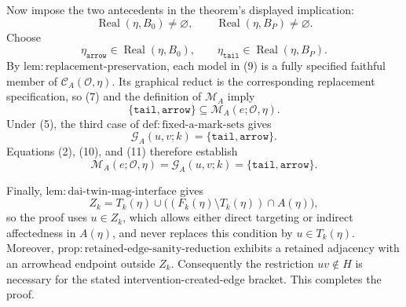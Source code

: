 Now impose the two antecedents in the theorem's displayed implication:
\[
 \operatorname{Real}(\eta,B_0)\ne\varnothing,
 \qquad
 \operatorname{Real}(\eta,B_P)\ne\varnothing.
 \tag{8}
\]
Choose
\[
 \eta_{\mathtt{arrow}}\in\operatorname{Real}(\eta,B_0),
 \qquad
 \eta_{\mathtt{tail}}\in\operatorname{Real}(\eta,B_P).
 \tag{9}
\]
By \(\mathrm{lem:replacement\mbox{-}preservation}\), each model in (9) is a fully specified faithful member of \(\mathcal C_A(\mathcal O,\eta)\).  Its graphical reduct is the corresponding replacement specification, so (7) and the definition of \(\mathcal M_A\) imply
\[
 \{\mathtt{tail},\mathtt{arrow}\}
 \subseteq\mathcal M_A(e;\mathcal O,\eta).
 \tag{10}
\]
Under (5), the third case of \(\mathrm{def:fixed\mbox{-}a\mbox{-}mark\mbox{-}sets}\) gives
\[
 \mathcal G_A(u,v;k)=\{\mathtt{tail},\mathtt{arrow}\}.
 \tag{11}
\]
Equations (2), (10), and (11) therefore establish
\[
 \mathcal M_A(e;\mathcal O,\eta)
 =\mathcal G_A(u,v;k)
 =\{\mathtt{tail},\mathtt{arrow}\}.
\]

Finally, \(\mathrm{lem:dai\mbox{-}twin\mbox{-}mag\mbox{-}interface}\) gives
\[
 Z_k=T_k(\eta)\cup
 \bigl((F_k(\eta)\setminus T_k(\eta))\cap A(\eta)\bigr),
\]
so the proof uses \(u\in Z_k\), which allows either direct targeting or indirect affectedness in \(A(\eta)\), and never replaces this condition by \(u\in T_k(\eta)\).  Moreover, \(\mathrm{prop:retained\mbox{-}edge\mbox{-}sanity\mbox{-}reduction}\) exhibits a retained adjacency with an arrowhead endpoint outside \(Z_k\).  Consequently the restriction \(uv\notin H\) is necessary for the stated intervention-created-edge bracket.  This completes the proof.
